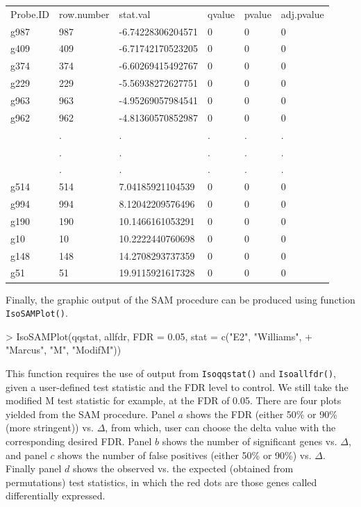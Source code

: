 \documentclass[10pt]{article}
\begin{document}
\begin{table}[!h]
\begin{left}
\begin{tabular}{llllll}
 Probe.ID & row.number & stat.val & qvalue & pvalue & adj.pvalue \\ 
 g987 & 987 & -6.74228306204571 & 0 & 0 & 0 \\ 
  g409 & 409 & -6.71742170523205 & 0 & 0 & 0 \\ 
  g374 & 374 & -6.60269415492767 & 0 & 0 & 0 \\ 
  g229 & 229 & -5.56938272627751 & 0 & 0 & 0 \\ 
  g963 & 963 & -4.95269057984541 & 0 & 0 & 0 \\ 
  g962 & 962 & -4.81360570852987 & 0 & 0 & 0 \\ 
   & . & . & . & . & . \\ 
   & . & . & . & . & . \\ 
   & . & . & . & . & . \\ 
  g514 & 514 & 7.04185921104539 & 0 & 0 & 0 \\ 
  g994 & 994 & 8.12042209576496 & 0 & 0 & 0 \\ 
  g190 & 190 & 10.1466161053291 & 0 & 0 & 0 \\ 
  g10 & 10 & 10.2222440760698 & 0 & 0 & 0 \\ 
  g148 & 148 & 14.2708293737359 & 0 & 0 & 0 \\ 
  g51 & 51 & 19.9115921617328 & 0 & 0 & 0 \\ 
  \end{tabular}
\end{left}
\end{table}


Finally, the graphic output of the SAM procedure can be produced using function \texttt{IsoSAMPlot()}.

\begin{Schunk}
\begin{Sinput}
> IsoSAMPlot(qqstat, allfdr, FDR = 0.05, stat = c("E2", "Williams", 
+     "Marcus", "M", "ModifM"))
\end{Sinput}
\end{Schunk}

This function requires the use of output from \texttt{Isoqqstat()} and \texttt{Isoallfdr()}, given a user-defined test statistic
and the FDR level to control. We still take the modified M test statistic for example, at the FDR of 0.05. There are four plots
yielded from the SAM procedure. Panel $a$ shows the FDR (either 50\% or 90\% (more stringent)) vs. $\Delta$, from which, user can choose the delta value with
the corresponding desired FDR. Panel $b$ shows the number of significant genes vs. $\Delta$, and panel $c$ shows the number of false positives (either 50\% or 90\%) vs. $\Delta$. Finally panel $d$ shows the observed vs. the expected (obtained from permutations) test statistics, in which the red dots are those genes called differentially expressed.
\end{document}
